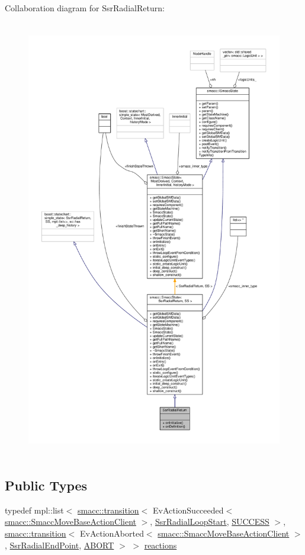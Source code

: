Collaboration diagram for Ssr\+Radial\+Return\+:
\nopagebreak
\begin{figure}[H]
\begin{center}
\leavevmode
\includegraphics[height=550pt]{structSsrRadialReturn__coll__graph}
\end{center}
\end{figure}
\subsection*{Public Types}
\begin{DoxyCompactItemize}
\item 
typedef mpl\+::list$<$ \hyperlink{classsmacc_1_1transition}{smacc\+::transition}$<$ Ev\+Action\+Succeeded$<$ \hyperlink{classsmacc_1_1SmaccMoveBaseActionClient}{smacc\+::\+Smacc\+Move\+Base\+Action\+Client} $>$, \hyperlink{structSsrRadialLoopStart}{Ssr\+Radial\+Loop\+Start}, \hyperlink{classSUCCESS}{S\+U\+C\+C\+E\+SS} $>$, \hyperlink{classsmacc_1_1transition}{smacc\+::transition}$<$ Ev\+Action\+Aborted$<$ \hyperlink{classsmacc_1_1SmaccMoveBaseActionClient}{smacc\+::\+Smacc\+Move\+Base\+Action\+Client} $>$, \hyperlink{structSsrRadialEndPoint}{Ssr\+Radial\+End\+Point}, \hyperlink{classABORT}{A\+B\+O\+RT} $>$ $>$ \hyperlink{structSsrRadialReturn_ae9ba2d9194983c0effd1ff54cecdc23e}{reactions}
\end{DoxyCompactItemize}

